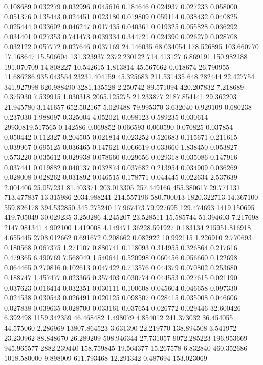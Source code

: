 0.108689
0.032279
0.032996
0.045616
0.184646
0.024937
0.027233
0.058000
0.051376
0.135443
0.024451
0.023180
0.019809
0.059114
0.038432
0.040825
0.025444
0.033602
0.046247
0.017435
0.040361
0.019325
0.055828
0.036292
0.031401
0.027353
0.741473
0.039334
0.344721
0.024390
0.026279
0.028708
0.032122
0.057772
0.027646
0.037169
24.146035
68.034054
178.526895
103.660770
17.168647
15.506604
131.323937
2372.230122
714.413127
6.869191
150.982188
191.070709
14.808227
10.542615
1.813814
45.567662
0.018674
26.790955
11.686286
935.043554
23231.404159
45.325683
211.531435
648.282444
22.427754
341.927998
620.988490
3281.135528
2.250742
89.571094
420.207832
7.218689
0.375930
7.539915
1.030318
2065.125275
21.233877
2187.854141
29.362203
21.945780
3.141657
652.502167
5.029488
79.995370
3.632040
0.929109
0.680238
0.237030
1.988097
0.325004
4.052021
0.098123
0.589235
0.030614
29930819.517565
0.142586
0.069852
0.066593
0.060590
0.070825
0.037854
0.050442
0.112327
0.204505
0.021814
0.023252
0.526683
0.115671
0.211615
0.039967
0.695125
0.036465
0.147621
0.066619
0.033660
1.838450
0.053827
0.573220
0.035612
0.029938
0.078660
0.029656
0.029318
0.035086
0.147916
0.037441
0.019882
0.040137
0.032874
0.037682
0.213954
0.034909
0.036269
0.028008
0.028262
0.031892
0.046515
0.178771
0.044445
0.022634
2.537639
2.001406
25.057231
81.403371
203.013305
257.449166
455.380617
29.771131
713.477837
13.315986
2034.988241
214.557196
580.700013
1820.322713
14.367100
559.826178
394.532850
345.275240
17.967473
79.927695
129.474693
1419.150695
419.705049
30.029235
3.250286
4.245207
23.528511
15.585744
51.394603
7.217698
2147.981341
4.902100
1.419008
4.149471
36228.591927
0.183134
215951.816918
4.655445
2708.012662
0.691672
0.208662
0.082922
10.992115
1.226910
2.770693
0.180568
0.067375
1.271107
0.880741
0.118093
0.314955
0.326864
0.217616
0.479365
6.490769
7.568049
1.540641
0.520998
0.060456
0.056660
0.122698
0.064465
0.270816
0.102613
0.047422
0.713576
0.044379
0.070802
0.253680
0.188747
1.457477
0.023366
0.357403
0.030774
0.044553
0.027615
0.021190
0.037623
0.016414
0.032351
0.030111
0.100608
0.045604
0.046658
0.097330
0.024538
0.030543
0.026491
0.020125
0.098507
0.028415
0.035008
0.046606
0.027838
0.039635
0.028700
0.033161
0.037654
0.026772
0.029446
32.600426
6.392498
1159.342359
46.468482
1.498079
4.854012
241.373032
36.454055
44.575060
2.286969
13807.864523
3.631390
22.219770
138.894508
3.541972
23.230962
88.848670
26.289209
508.946344
27.731057
9072.285223
196.953669
945.965577
2882.239440
158.759845
19.564377
15.267578
6.832840
460.352686
1018.580000
9.898009
611.793468
12.291342
0.487694
153.023069
